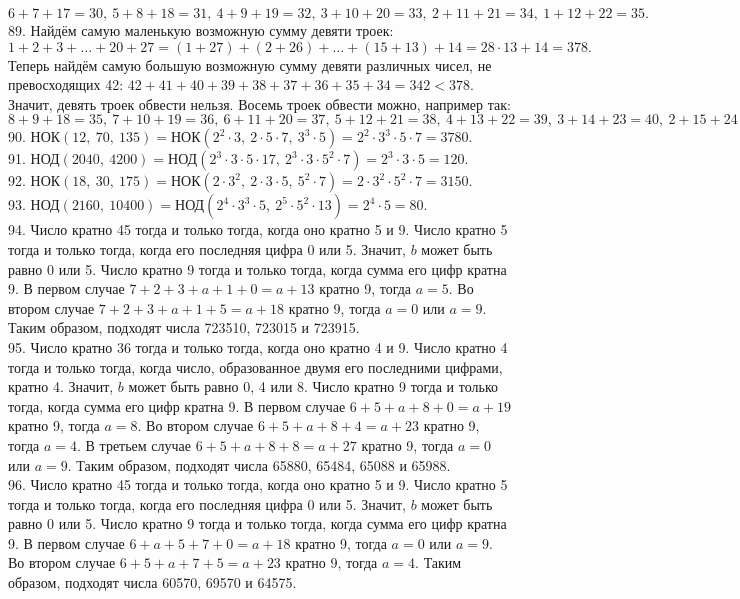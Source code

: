 $6+7+17=30,\ 5+8+18=31,\ 4+9+19=32,\ 3+10+20=33,\ 2+11+21=34,\ 1+12+22=35.$\\
89. Найдём самую маленькую возможную сумму девяти троек: $1+2+3+\ldots+20+27=(1+27)+(2+26)+\ldots+(15+13)+14=28\cdot13+14=378.$ Теперь найдём самую большую возможную сумму девяти различных чисел, не превосходящих 42: $42+41+40+39+38+37+36+35+34=342<378.$ Значит, девять троек обвести нельзя. Восемь троек обвести можно, например так:
$8+9+18=35,\ 7+10+19=36,\ 6+11+20=37,\ 5+12+21=38,\ 4+13+22=39,\ 3+14+23=40,\ 2+15+24=41,\ 1+16+25=42.$\\
90. НОК$(12,\ 70,\ 135) =$НОК$(2^2\cdot3,\ 2\cdot5\cdot7,\ 3^3\cdot5)=2^2\cdot3^3\cdot5\cdot7=3780.$\\
91. НОД$(2040,\ 4200)=$НОД$(2^3\cdot3\cdot5\cdot17,\ 2^3\cdot3\cdot5^2\cdot7)=2^3\cdot3\cdot5=120.$\\
92. НОК$(18,\ 30,\ 175)=$НОК$(2\cdot3^2,\ 2\cdot3\cdot5,\ 5^2\cdot7)=2\cdot3^2\cdot5^2\cdot7=3150.$\\
93. НОД$(2160,\ 10400)=$НОД$(2^4\cdot3^3\cdot5,\ 2^5\cdot5^2\cdot13)=2^4\cdot5=80.$\\
94. Число кратно 45 тогда и только тогда, когда оно кратно 5 и 9. Число кратно 5 тогда и только тогда, когда его последняя цифра 0 или 5. Значит, $b$ может быть равно 0 или 5. Число кратно 9 тогда и только тогда, когда сумма его цифр кратна 9. В первом случае $7+2+3+a+1+0=a+13$ кратно 9, тогда $a=5.$ Во втором случае
$7+2+3+a+1+5=a+18$ кратно 9, тогда $a=0$ или $a=9.$ Таким образом, подходят числа 723510, 723015 и 723915.\\
95. Число кратно 36 тогда и только тогда, когда оно кратно 4 и 9. Число кратно 4 тогда и только тогда, когда число, образованное двумя его последними цифрами, кратно 4. Значит, $b$ может быть равно 0, 4 или 8. Число кратно 9 тогда и только тогда, когда сумма его цифр кратна 9. В первом случае $6+5+a+8+0=a+19$ кратно 9, тогда $a=8.$ Во втором случае $6+5+a+8+4=a+23$ кратно 9, тогда $a=4.$ В третьем случае $6+5+a+8+8=a+27$ кратно 9, тогда $a=0$ или $a=9.$ Таким образом, подходят числа 65880, 65484, 65088 и 65988.\\
96. Число кратно 45 тогда и только тогда, когда оно кратно 5 и 9. Число кратно 5 тогда и только тогда, когда его последняя цифра 0 или 5. Значит, $b$ может быть равно 0 или 5. Число кратно 9 тогда и только тогда, когда сумма его цифр кратна 9. В первом случае $6+a+5+7+0=a+18$ кратно 9, тогда $a=0$ или $a=9.$ Во втором случае $6+5+a+7+5=a+23$ кратно 9, тогда $a=4.$ Таким образом, подходят числа 60570, 69570 и 64575.\\
